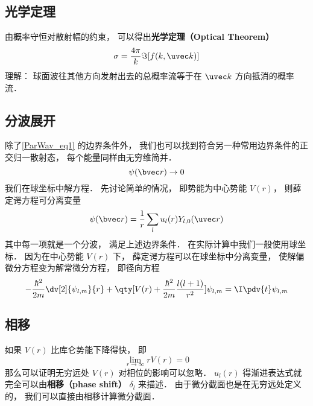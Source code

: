 \subsection{光学定理}
由概率守恒对散射幅的约束， 可以得出\textbf{光学定理（Optical Theorem）}
\begin{equation}
\sigma = \frac{4\pi}{k} \Im[f(k, \uvec k)]
\end{equation}
理解： 球面波往其他方向发射出去的总概率流等于在 $\uvec k$ 方向抵消的概率流．

\subsection{分波展开}

除了\autoref{ParWav_eq1} 的边界条件外， 我们也可以找到符合另一种常用边界条件的正交归一散射态， 每个能量同样由无穷维简并．
\begin{equation}
\psi(\bvec r) \rightarrow 0
\end{equation}
我们在球坐标中解方程． 先讨论简单的情况， 即势能为中心势能 $V(r)$， 则薛定谔方程可分离变量 %
\begin{equation}
\psi(\bvec r) = \frac{1}{r} \sum_l u_l(r) Y_{l,0}(\uvec r)
\end{equation}
其中每一项就是一个分波， 满足上述边界条件． 在实际计算中我们一般使用球坐标． 因为在中心势能 $V(r)$ 下， 薛定谔方程可以在球坐标中分离变量， 使解偏微分方程变为解常微分方程， 即径向方程 %
\begin{equation}
-\frac{\hbar^2}{2m} \dv[2]{\psi_{l,m}}{r} + \qty[V(r) + \frac{\hbar^2}{2m}\frac{l(l + 1)}{r^2}]\psi_{l,m} = \I \pdv{t} \psi_{l,m}
\end{equation}

\subsection{相移}
如果 $V(r)$ 比库仑势能下降得快， 即
\begin{equation}
\lim_{r\to\infty} r V(r) = 0
\end{equation}
那么可以证明无穷远处 $V(r)$ 对相位的影响可以忽略． $u_l(r)$ 得渐进表达式就完全可以由\textbf{相移（phase shift）} $\delta_l$ 来描述． 由于微分截面也是在无穷远处定义的， 我们可以直接由相移计算微分截面．

